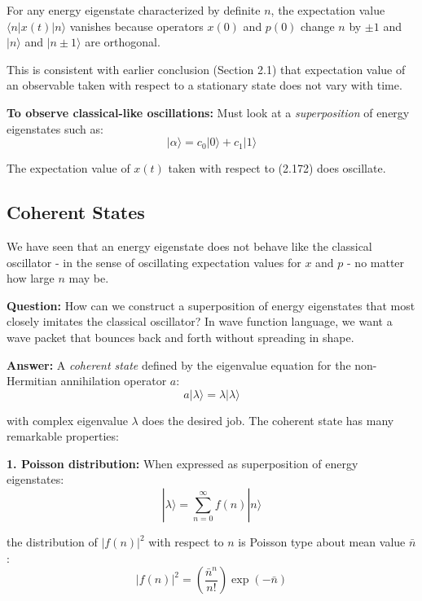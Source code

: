 \documentclass[11pt,a4paper]{article}
\begin{document}
For any energy eigenstate characterized by definite $n$, the expectation value $\langle n|x(t)|n\rangle$ vanishes because operators $x(0)$ and $p(0)$ change $n$ by $\pm 1$ and $|n\rangle$ and $|n\pm 1\rangle$ are orthogonal.

This is consistent with earlier conclusion (Section 2.1) that expectation value of an observable taken with respect to a stationary state does not vary with time.

\textbf{To observe classical-like oscillations:} Must look at a \textit{superposition} of energy eigenstates such as:
\begin{equation}
|\alpha\rangle = c_0|0\rangle + c_1|1\rangle
\tag{2.172}
\end{equation}

The expectation value of $x(t)$ taken with respect to (2.172) does oscillate.

\subsection{Coherent States}

We have seen that an energy eigenstate does not behave like the classical oscillator - in the sense of oscillating expectation values for $x$ and $p$ - no matter how large $n$ may be.

\textbf{Question:} How can we construct a superposition of energy eigenstates that most closely imitates the classical oscillator? In wave function language, we want a wave packet that bounces back and forth without spreading in shape.

\textbf{Answer:} A \textit{coherent state} defined by the eigenvalue equation for the non-Hermitian annihilation operator $a$:
\begin{equation}
a|\lambda\rangle = \lambda|\lambda\rangle
\tag{2.173}
\end{equation}

with complex eigenvalue $\lambda$ does the desired job. The coherent state has many remarkable properties:

\textbf{1. Poisson distribution:}
When expressed as superposition of energy eigenstates:
\begin{equation}
|\lambda\rangle = \sum_{n=0}^{\infty}f(n)|n\rangle
\tag{2.174}
\end{equation}

the distribution of $|f(n)|^2$ with respect to $n$ is Poisson type about mean value $\bar{n}$:
\begin{equation}
|f(n)|^2 = \left(\frac{\bar{n}^n}{n!}\right)\exp(-\bar{n})
\tag{2.175}
\end{equation}
\end{document}
